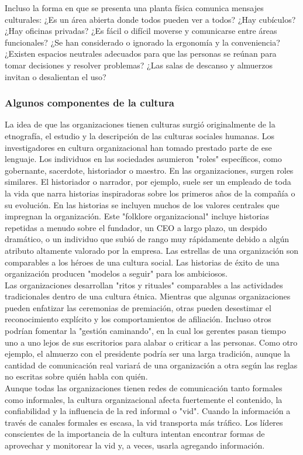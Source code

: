 \documentclass[10pt]{book}
\begin{document}
Incluso la forma en que se presenta una planta física comunica mensajes culturales: ¿Es un área abierta donde todos pueden ver a todos? ¿Hay cubículos? ¿Hay oficinas privadas? ¿Es fácil o difícil moverse y comunicarse entre áreas funcionales? ¿Se han considerado o ignorado la ergonomía y la conveniencia? ¿Existen espacios neutrales adecuados para que las personas se reúnan para tomar decisiones y resolver problemas? ¿Las salas de descanso y almuerzos invitan o desalientan el uso?
\subsubsection{Algunos componentes de la cultura}
La idea de que las organizaciones tienen culturas surgió originalmente de la etnografía, el estudio y la descripción de las culturas sociales humanas. Los investigadores en cultura organizacional han tomado prestado parte de ese lenguaje. Los individuos en las sociedades asumieron "roles" específicos, como gobernante, sacerdote, historiador o maestro. En las organizaciones, surgen roles similares. El historiador o narrador, por ejemplo, suele ser un empleado de toda la vida que narra historias inspiradoras sobre los primeros años de la compañía o su evolución. En las historias se incluyen muchos de los valores centrales que impregnan la organización. Este "folklore organizacional" incluye historias repetidas a menudo sobre el fundador, un CEO a largo plazo, un despido dramático, o un individuo que subió de rango muy rápidamente debido a algún atributo altamente valorado por la empresa. Las estrellas de una organización son comparables a los héroes de una cultura social. Las historias de éxito de una organización producen "modelos a seguir" para los ambiciosos.\\
Las organizaciones desarrollan "ritos y rituales" comparables a las actividades tradicionales dentro de una cultura étnica. Mientras que algunas organizaciones pueden enfatizar las ceremonias de premiación, otras pueden desestimar el reconocimiento explícito y los comportamientos de afiliación. Incluso otros podrían fomentar la "gestión caminando", en la cual los gerentes pasan tiempo uno a uno lejos de sus escritorios para alabar o criticar a las personas. Como otro ejemplo, el almuerzo con el presidente podría ser una larga tradición, aunque la cantidad de comunicación real variará de una organización a otra según las reglas no escritas sobre quién habla con quién.\\
Aunque todas las organizaciones tienen redes de comunicación tanto formales como informales, la cultura organizacional afecta fuertemente el contenido, la confiabilidad y la influencia de la red informal o "vid". Cuando la información a través de canales formales es escasa, la vid transporta más tráfico. Los líderes conscientes de la importancia de la cultura intentan encontrar formas de aprovechar y monitorear la vid y, a veces, usarla agregando información.
\end{document}
